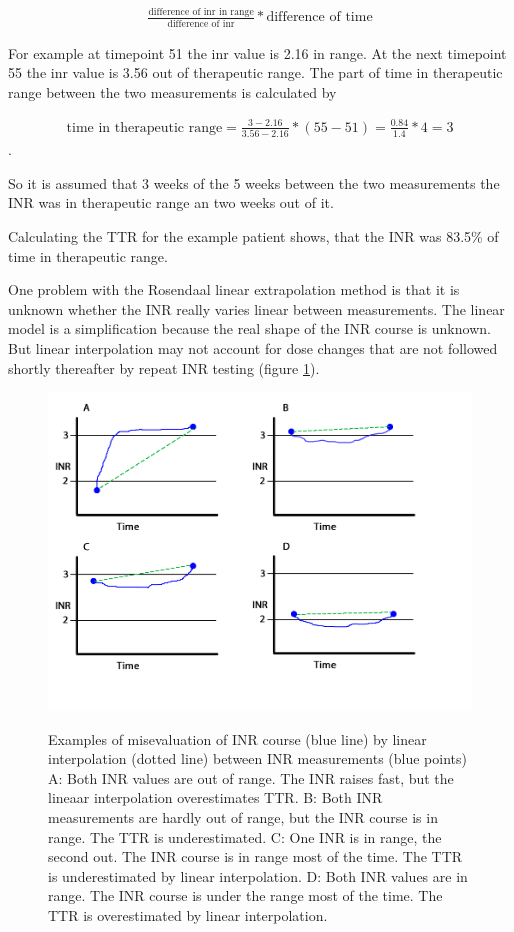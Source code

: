 \begin{align}
	\frac{\text{difference of inr in range}}{\text{difference of inr}} * {\text{difference of time}}
\end{align} 

For example at timepoint 51 the inr value is 2.16 in range. At the next timepoint 55 the inr value is 3.56 out of therapeutic range. 
The part of time in therapeutic range between the two measurements is calculated by

\begin{align} 
\text{time in therapeutic range} = \frac{3-2.16}{3.56-2.16}*(55-51)=\frac{0.84}{1.4}*4=3
\end{align}. 

So it is assumed that 3 weeks of the 5 weeks between the two measurements the \ac{INR} was in therapeutic range an two weeks out of it. 

Calculating the \ac{TTR} for the example patient shows, that the \ac{INR} was 83.5\% of time in therapeutic range.   
     
One problem with the Rosendaal linear extrapolation method is that it is unknown whether the \ac{INR} really varies linear between measurements. The linear model is a simplification because the real shape of the \ac{INR} course is unknown. But linear interpolation may not account for dose changes that are not followed shortly thereafter by repeat \ac{INR} testing (figure \ref{rosendaal_examples}).

\begin{figure}
	\centering
	\includegraphics{rosendaal_examples.png}
	\label{rosendaal_examples}
	\caption{Examples of misevaluation  of \ac{INR} course (blue line) by linear interpolation (dotted line) between \ac{INR} measurements (blue points) 
	A: Both \ac{INR} values are out of range. The INR raises fast, but the lineaar interpolation overestimates \ac{TTR}. B: Both \ac{INR} measurements are hardly out of range, but the \ac{INR} course is in range. The \ac{TTR} is underestimated. C: One \ac{INR} is in range, the second out. The \ac{INR} course is in range most of the time. The \ac{TTR} is underestimated by linear interpolation. D: Both \ac{INR} values are in range. The \ac{INR} course is under the range most of the time. The \ac{TTR} is overestimated by linear interpolation.}
\end{figure}

